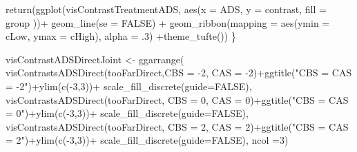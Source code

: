 \documentclass[
  10pt,
  dvipsnames,enabledeprecatedfontcommands]{scrartcl}
\newenvironment{Shaded}{\begin{snugshade}}{\end{snugshade}}
\newcommand{\AttributeTok}[1]{\textcolor[rgb]{0.77,0.63,0.00}{#1}}
\newcommand{\ConstantTok}[1]{\textcolor[rgb]{0.00,0.00,0.00}{#1}}
\newcommand{\DecValTok}[1]{\textcolor[rgb]{0.00,0.00,0.81}{#1}}
\newcommand{\FunctionTok}[1]{\textcolor[rgb]{0.00,0.00,0.00}{#1}}
\newcommand{\NormalTok}[1]{#1}
\newcommand{\OtherTok}[1]{\textcolor[rgb]{0.56,0.35,0.01}{#1}}
\newcommand{\SpecialCharTok}[1]{\textcolor[rgb]{0.00,0.00,0.00}{#1}}
\newcommand{\StringTok}[1]{\textcolor[rgb]{0.31,0.60,0.02}{#1}}
\begin{document}
\begin{Shaded}
\begin{Highlighting}[]
  \FunctionTok{return}\NormalTok{(}\FunctionTok{ggplot}\NormalTok{(visContrastTreatmentADS, }\FunctionTok{aes}\NormalTok{(}\AttributeTok{x =}\NormalTok{ ADS, }\AttributeTok{y =}\NormalTok{ contrast, }\AttributeTok{fill =}\NormalTok{ group ))}\SpecialCharTok{+}
           \FunctionTok{geom\_line}\NormalTok{(}\AttributeTok{se =} \ConstantTok{FALSE}\NormalTok{) }\SpecialCharTok{+}
           \FunctionTok{geom\_ribbon}\NormalTok{(}\AttributeTok{mapping =} \FunctionTok{aes}\NormalTok{(}\AttributeTok{ymin =}\NormalTok{ cLow, }\AttributeTok{ymax =}\NormalTok{ cHigh), }
                       \AttributeTok{alpha =}\NormalTok{ .}\DecValTok{3}\NormalTok{) }\SpecialCharTok{+}\FunctionTok{theme\_tufte}\NormalTok{())}
\NormalTok{\}}





\NormalTok{visContrastADSDirectJoint }\OtherTok{\textless{}{-}} \FunctionTok{ggarrange}\NormalTok{(}
  \FunctionTok{visContrastsADSDirect}\NormalTok{(tooFarDirect,}\AttributeTok{CBS =} \SpecialCharTok{{-}}\DecValTok{2}\NormalTok{, }\AttributeTok{CAS =} \SpecialCharTok{{-}}\DecValTok{2}\NormalTok{)}\SpecialCharTok{+}\FunctionTok{ggtitle}\NormalTok{(}\StringTok{"CBS = CAS = {-}2"}\NormalTok{)}\SpecialCharTok{+}\FunctionTok{ylim}\NormalTok{(}\FunctionTok{c}\NormalTok{(}\SpecialCharTok{{-}}\DecValTok{3}\NormalTok{,}\DecValTok{3}\NormalTok{))}\SpecialCharTok{+} \FunctionTok{scale\_fill\_discrete}\NormalTok{(}\AttributeTok{guide=}\ConstantTok{FALSE}\NormalTok{),}
  \FunctionTok{visContrastsADSDirect}\NormalTok{(tooFarDirect, }\AttributeTok{CBS =} \DecValTok{0}\NormalTok{, }\AttributeTok{CAS =} \DecValTok{0}\NormalTok{)}\SpecialCharTok{+}\FunctionTok{ggtitle}\NormalTok{(}\StringTok{"CBS = CAS = 0"}\NormalTok{)}\SpecialCharTok{+}\FunctionTok{ylim}\NormalTok{(}\FunctionTok{c}\NormalTok{(}\SpecialCharTok{{-}}\DecValTok{3}\NormalTok{,}\DecValTok{3}\NormalTok{))}\SpecialCharTok{+} \FunctionTok{scale\_fill\_discrete}\NormalTok{(}\AttributeTok{guide=}\ConstantTok{FALSE}\NormalTok{),}
  \FunctionTok{visContrastsADSDirect}\NormalTok{(tooFarDirect, }\AttributeTok{CBS =} \DecValTok{2}\NormalTok{, }\AttributeTok{CAS =} \DecValTok{2}\NormalTok{)}\SpecialCharTok{+}\FunctionTok{ggtitle}\NormalTok{(}\StringTok{"CBS = CAS = 2"}\NormalTok{)}\SpecialCharTok{+}\FunctionTok{ylim}\NormalTok{(}\FunctionTok{c}\NormalTok{(}\SpecialCharTok{{-}}\DecValTok{3}\NormalTok{,}\DecValTok{3}\NormalTok{))}\SpecialCharTok{+} \FunctionTok{scale\_fill\_discrete}\NormalTok{(}\AttributeTok{guide=}\ConstantTok{FALSE}\NormalTok{),}
  \AttributeTok{ncol =}\DecValTok{3}\NormalTok{)}
\end{Highlighting}
\end{Shaded}
\end{document}
